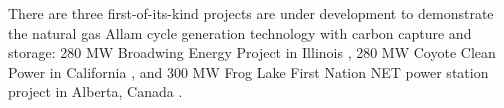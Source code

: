 \documentclass[pdflatex,sn-basic, Numbered]{sn-jnl}
\begin{document}

There are three first-of-its-kind projects are under development to demonstrate the natural gas Allam cycle generation technology with carbon capture and storage:  280 MW Broadwing Energy Project in Illinois \cite{BroadwingEnergyProject}, 280 MW Coyote Clean Power in California \cite{CoyoteCleanPower}, and 300 MW Frog Lake First Nation NET power station project in Alberta, Canada \cite{FrogLakeProject}.


%
\end{document}
